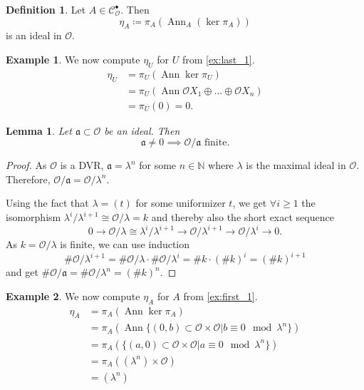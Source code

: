 \documentclass{article}
\theoremstyle{plain}%
\newtheorem{lemma}{Lemma}[section]
\theoremstyle{definition}
\newtheorem{definition}{Definition}[section]
\newtheorem{example}{Example}[section]
\theoremstyle{remark}
\newcommand{\cob}{\mathcal{C}_\mathcal{O}^\bullet}
\newcommand{\ann}{\operatorname{Ann}}
\begin{document}
\begin{definition}
    Let \(A \in \cob\). Then
    \[\eta_A \coloneqq \pi_A(\ann_A (\ker \pi_A))\] is an ideal in \(\mathcal{O}\).
\end{definition}

\begin{example}
    We now compute \(\eta_U\) for \(U\) from \cref{ex:last_1}.
    \begin{align*}
        \eta_U &= \pi_U(\ann \ker \pi_U)\\
        &= \pi_U(\ann \mathcal{O}X_1 \oplus \dots \oplus \mathcal{O}X_n)\\
        &= \pi_U(0) = 0.
    \end{align*}
\end{example}

\begin{lemma}\label{lem:ideals}
    Let \(\mathfrak a \subset \mathcal{O}\) be an ideal. Then
    \[\mathfrak a \neq 0 \implies \mathcal{O}/\mathfrak a \text{ finite}.\]
\end{lemma}
\begin{proof}
    As \(\mathcal{O}\) is a DVR, \(\mathfrak a = \lambda^n\) for some \(n \in \mathbb N\) 
    where \(\lambda\) is the maximal ideal in \(\mathcal{O}\).
    Therefore, \(\mathcal{O}/\mathfrak{a} = \mathcal{O}/\lambda^n.\)

    Using the fact that \(\lambda = (t)\) for some uniformizer \(t\), we get \(\forall i \ge 1\) 
    the isomorphism \(\lambda^i/\lambda^{i+1} \cong \mathcal{O}/\lambda = k\) and thereby also the short exact sequence 
    \[0 \to \mathcal{O}/\lambda \cong \lambda^i/\lambda^{i+1} \to \mathcal{O}/\lambda^{i+1} \to \mathcal{O}/\lambda^{i} \to 0.\]
    As \(k = \mathcal{O}/\lambda\) is finite, we can use induction
    \[\# \mathcal{O}/\lambda^{i+1} = \# \mathcal{O}/\lambda \cdot \# \mathcal{O}/\lambda^i = \# k \cdot (\# k)^i = (\# k)^{i+1}\]
    and get \(\# \mathcal{O}/\mathfrak{a} = \# \mathcal{O}/\lambda^n = (\# k)^n\).
\end{proof}

\begin{example}\label{ex:first_eta}
    We now compute \(\eta_A\) for \(A\) from \cref{ex:first_1}.
    \begin{align*}
        \eta_A &= \pi_A(\ann \ker \pi_A)\\
        &= \pi_A(\ann \{(0, b) \subset \mathcal{O}\times \mathcal{O} | b \equiv 0 \mod \lambda^n\})\\
        &= \pi_A(\{(a, 0) \subset \mathcal{O}\times \mathcal{O} | a \equiv 0 \mod \lambda^n\})\\
        &= \pi_A((\lambda^n) \times \mathcal{O})\\
        &= (\lambda^n)
    \end{align*}
\end{example}
\end{document}
